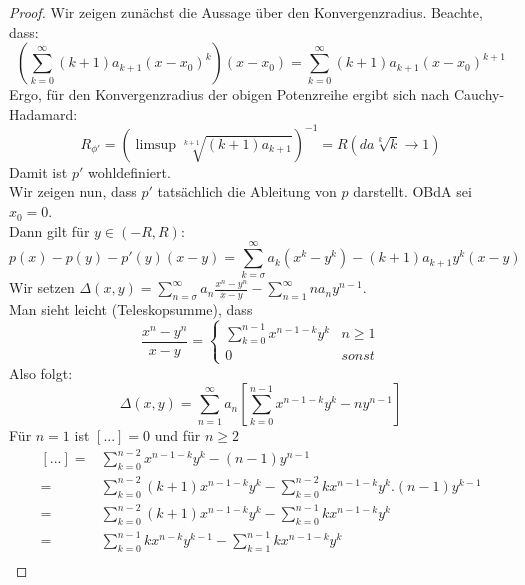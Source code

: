 \begin{proof}
Wir zeigen zunächst die Aussage über den Konvergenzradius. 
	Beachte, dass: 
	\begin{equation*}
		\left(\sum_{k=0}^{\infty} \left( k+1 \right) a_{k+1} \left( x -x_0 \right)^k \right)
		\left(x-x_0\right) = \sum_{k=0}^{\infty} \left(k+1\right) 
		a_{k+1} \left(x-x_0\right)^{k+1}
	\end{equation*}
	Ergo, für den Konvergenzradius der obigen Potenzreihe ergibt sich nach Cauchy-
	Hadamard:
	\begin{equation*}
		R_{\phi'} = \left(\limsup \sqrt[k+1]{\left(k+1\right)a_{k+1}}\right)^{-1}
		= R \left(\textit{da} \sqrt[k]{k} \rightarrow 1\right)
	\end{equation*}
	Damit ist $p'$ wohldefiniert.\\
	 Wir zeigen nun, dass $p'$ tatsächlich die Ableitung von $p$ darstellt. 
	 OBdA sei $x_0 = 0$. \\
	Dann gilt für $y \in \left(-R,R\right)$:
	\begin{equation*}
		p\left(x\right)-p\left(y\right) - p'\left(y\right)\left(x-y\right) 
		= \sum_{k= \sigma}^{\infty} a_k \left(x^k -y^k\right) - \left(k+1\right) 
		a_{k+1} y^k\left(x-y\right)
	\end{equation*}
	Wir setzen $\Delta\left(x,y\right) = \sum_{n=\sigma}^{\infty} a_n 
	\frac{x^n - y^n}{x-y} - \sum_{n = 1}^{\infty}n a_n y^{n-1}$. \\
	Man sieht leicht (Teleskopsumme), dass
	\begin{equation*}
		\frac{x^n-y^n}{x-y} = \begin{cases}\sum_{k=0}^{n-1}x^{n-1-k}y^k & n \geq 1 
		\\ 0 & sonst \end{cases}
	\end{equation*}
	Also folgt: 
	\begin{equation*}
		\Delta\left(x,y\right) = \sum_{n=1}^{\infty} a_n \left[ \sum_{k=0}^{n-1} 
		x^{n-1-k}y^k -ny^{n-1}\right]
	\end{equation*}
	Für $n=1$ ist $\left[...\right] = 0$ und für $n\geq 2$
	\begin{align*}
		\left[...\right]  = & \sum_{k=0}^{n-2} x^{n-1-k}y^k - (n-1)y^{n-1} \\
		 = & \sum_{k=0}^{n-2} (k+1) x^{n-1-k}y^k - \sum_{k=0}^{n-2}kx^{n-1-k}y^k 
		.(n-1)y^{k-1} \\
		= & \sum_{k=0}^{n-2} (k+1) x^{n-1-k}y^k - \sum_{k=0}^{n-1}kx^{n-1-k}y^k \\
		= & \sum_{k=0}^{n-1} k x^{n-k} y^{k-1} - \sum_{k=1}^{n-1}kx^{n-1-k}y^k \\

\end{align*}
\end{proof}
